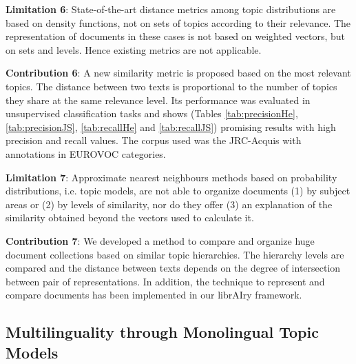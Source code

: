 \textbf{Limitation 6}: State-of-the-art distance metrics among topic distributions are based on density functions, not on sets of topics according to their relevance. The representation of documents in these cases is not based on weighted vectors, but on sets and levels. Hence existing metrics are not applicable.

\textbf{Contribution 6}: A new similarity metric is proposed based on the most relevant topics. The distance between two texts is proportional to the number of topics they share at the same relevance level. Its performance was evaluated in unsupervised classification tasks and shows (Tables \ref{tab:precisionHe}, \ref{tab:precisionJS}, \ref{tab:recallHe} and \ref{tab:recallJS}) promising results with high precision and recall values. The corpus used was the JRC-Acquis with annotations in EUROVOC categories.

\textbf{Limitation 7}: Approximate nearest neighbours methods based on probability distributions, i.e. topic models, are not able to organize documents (1) by subject areas or (2) by levels of similarity, nor do they offer (3) an explanation of the similarity obtained beyond the vectors used to calculate it.

\textbf{Contribution 7}: We developed a method to compare and organize huge document collections based on similar topic hierarchies. The hierarchy levels are compared and the distance between texts depends on the degree of intersection between pair of representations. In addition, the technique to represent and compare documents has been implemented in our librAIry framework.


\subsection{Multilinguality through Monolingual Topic Models}

